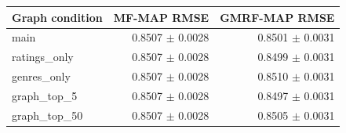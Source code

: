 \begin{tabular}{@{}lrr@{}}\toprule
Graph condition & MF-MAP RMSE & GMRF-MAP RMSE\\\midrule
main & 0.8507 $\pm$ 0.0028 & 0.8501 $\pm$ 0.0031\\
ratings\_only & 0.8507 $\pm$ 0.0028 & 0.8499 $\pm$ 0.0031\\
genres\_only & 0.8507 $\pm$ 0.0028 & 0.8510 $\pm$ 0.0031\\
graph\_top\_5 & 0.8507 $\pm$ 0.0028 & 0.8497 $\pm$ 0.0031\\
graph\_top\_50 & 0.8507 $\pm$ 0.0028 & 0.8505 $\pm$ 0.0031\\
\bottomrule\end{tabular}
